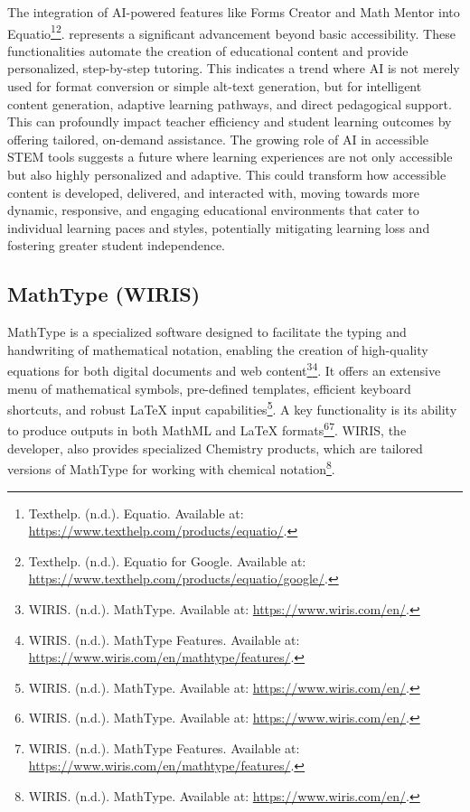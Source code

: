 The integration of AI-powered features like Forms Creator and Math Mentor into Equatio\footnote{Texthelp. (n.d.). Equatio. Available at: \url{https://www.texthelp.com/products/equatio/}.}\footnote{Texthelp. (n.d.). Equatio for Google. Available at: \url{https://www.texthelp.com/products/equatio/google/}.}. represents a significant advancement beyond basic accessibility. These functionalities automate the creation of educational content and provide personalized, step-by-step tutoring. This indicates a trend where AI is not merely used for format conversion or simple alt-text generation, but for intelligent content generation, adaptive learning pathways, and direct pedagogical support. This can profoundly impact teacher efficiency and student learning outcomes by offering tailored, on-demand assistance. The growing role of AI in accessible STEM tools suggests a future where learning experiences are not only accessible but also highly personalized and adaptive. This could transform how accessible content is developed, delivered, and interacted with, moving towards more dynamic, responsive, and engaging educational environments that cater to individual learning paces and styles, potentially mitigating learning loss and fostering greater student independence.

\subsection{MathType (WIRIS)}

MathType is a specialized software designed to facilitate the typing and handwriting of mathematical notation, enabling the creation of high-quality equations for both digital documents and web content\footnote{WIRIS. (n.d.). MathType. Available at: \url{https://www.wiris.com/en/}.}\footnote{WIRIS. (n.d.). MathType Features. Available at: \url{https://www.wiris.com/en/mathtype/features/}.}. It offers an extensive menu of mathematical symbols, pre-defined templates, efficient keyboard shortcuts, and robust LaTeX input capabilities\footnote{WIRIS. (n.d.). MathType. Available at: \url{https://www.wiris.com/en/}.}. A key functionality is its ability to produce outputs in both MathML and LaTeX formats\footnote{WIRIS. (n.d.). MathType. Available at: \url{https://www.wiris.com/en/}.}\footnote{WIRIS. (n.d.). MathType Features. Available at: \url{https://www.wiris.com/en/mathtype/features/}.}. WIRIS, the developer, also provides specialized Chemistry products, which are tailored versions of MathType for working with chemical notation\footnote{WIRIS. (n.d.). MathType. Available at: \url{https://www.wiris.com/en/}.}.

